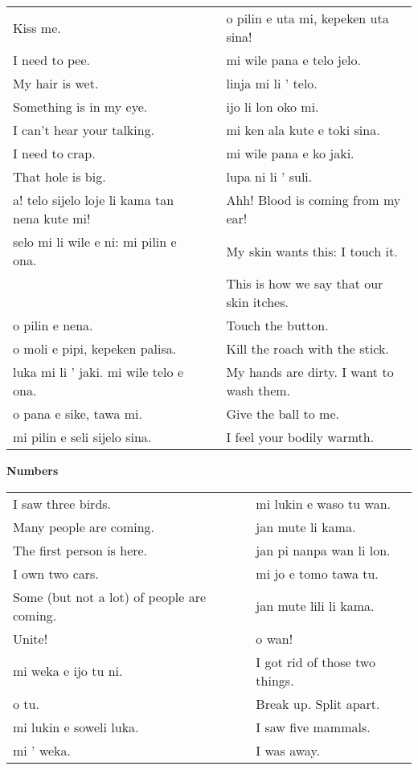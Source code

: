 \begin{supertabular}{p{5,5cm}|ll}
Kiss me.  && o pilin e uta mi, kepeken uta sina! \\ %
I need to pee.  && mi wile pana e telo jelo. \\ %
My hair is wet.  && linja mi li ' telo. \\ %
Something is in my eye.  && ijo li lon oko mi. \\ %
I can't hear your talking.  && mi ken ala kute e toki sina. \\ %
I need to crap.  && mi wile pana e ko jaki. \\ %
That hole is big.  && lupa ni li ' suli. \\ %
a! telo sijelo loje li kama tan nena kute mi!  && Ahh! Blood is coming from my ear! \\
selo mi li wile e ni: mi pilin e ona.  && My skin wants this: I touch it. \\
   && This is how we say that our skin itches. \\  %
o pilin e nena.  && Touch the button. \\
o moli e pipi, kepeken palisa.  && Kill the roach with the stick. \\
luka mi li ' jaki. mi wile telo e ona.  && My hands are dirty. I want to wash them. \\
o pana e sike, tawa mi.  && Give the ball to me. \\
mi pilin e seli sijelo sina.  && I feel your bodily warmth. \\
\end{supertabular} 
%
\newpage
\textbf{Numbers} 
\label{'numbers'}

\begin{supertabular}{p{5,5cm}|ll}
I saw three birds.  && mi lukin e waso tu wan. \\ %
Many people are coming.  && jan mute li kama. \\ %
The first person is here.  && jan pi nanpa wan li lon. \\ %
I own two cars.  && mi jo e tomo tawa tu. \\ %
Some (but not a lot) of people are coming.  && jan mute lili li kama. \\ %
Unite!  && o wan! \\ %
mi weka e ijo tu ni.  && I got rid of those two things. \\
o tu.  && Break up. Split apart. \\
mi lukin e soweli luka.  && I saw five mammals. \\
mi ' weka.  && I was away. \\
\end{supertabular} 


